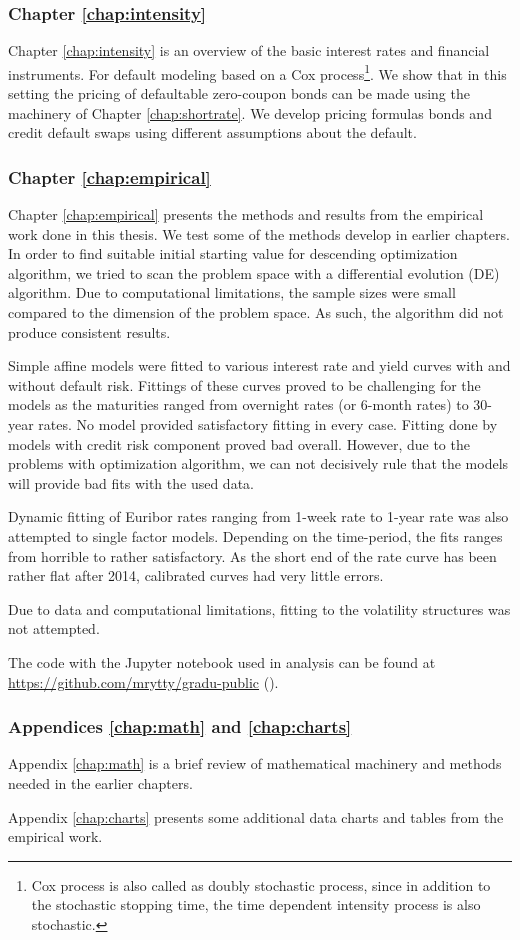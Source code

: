 \subsubsection*{Chapter \ref{chap:intensity}}

Chapter \ref{chap:intensity} is an overview of the basic interest rates and financial instruments. For default modeling based on a Cox process\footnote{Cox process is also called as doubly stochastic process, since in addition to the stochastic stopping time, the time dependent intensity process is also stochastic.}. We show that in this setting the pricing of defaultable zero-coupon bonds can be made using the machinery of Chapter \ref{chap:shortrate}. We develop pricing formulas bonds and credit default swaps using different assumptions about the default.     

\subsubsection*{Chapter \ref{chap:empirical}}

Chapter \ref{chap:empirical} presents the methods and results from the empirical work done in this thesis. We test some of the methods develop in earlier chapters. In order to find suitable initial starting value for descending optimization algorithm, we tried to scan the problem space with a differential evolution (DE) algorithm. Due to computational limitations, the sample sizes were small compared to the dimension of the problem space. As such, the algorithm did not produce consistent results.

Simple affine models were fitted to various interest rate and yield curves with and without default risk. Fittings of these curves proved to be challenging for the models as the maturities ranged from overnight rates (or 6-month rates) to 30-year rates. No model provided satisfactory fitting in every case. Fitting done by models with credit risk component proved bad overall. However, due to the problems with optimization algorithm, we can not decisively rule that the models will provide bad fits with the used data.

Dynamic fitting of Euribor rates ranging from 1-week rate to 1-year rate was also attempted to single factor models. Depending on the time-period, the fits ranges from horrible to rather satisfactory. As the short end of the rate curve has been rather flat after 2014, calibrated curves had very little errors.

Due to data and computational limitations, fitting to the volatility structures was not attempted.  

The code with the Jupyter notebook used in analysis can be found at \url{https://github.com/mrytty/gradu-public} (\textcite{rytty}).

\subsubsection*{Appendices \ref{chap:math} and \ref{chap:charts}}

Appendix \ref{chap:math} is a brief review of mathematical machinery and methods needed in the earlier chapters.

Appendix \ref{chap:charts} presents some additional data charts and tables from the empirical work. 
